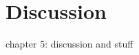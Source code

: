 \chapter[Discussion]{Discussion} \label{c:discussion} \glsresetall
%
chapter 5: discussion and stuff